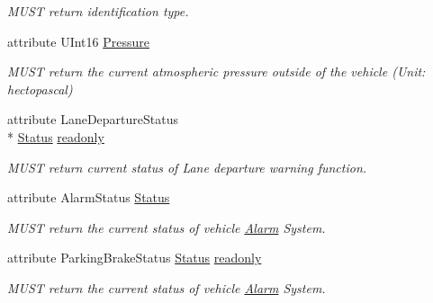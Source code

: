 \begin{DoxyCompactItemize}
\begin{DoxyCompactList}\small\item\em M\+U\+S\+T return identification type. \end{DoxyCompactList}\item 
\hypertarget{interfaceVehiclePropertyType_ab38c3d3e43448122ff441f04e184344b}{attribute U\+Int16 \hyperlink{interfaceVehiclePropertyType_ab38c3d3e43448122ff441f04e184344b}{Pressure}}\label{interfaceVehiclePropertyType_ab38c3d3e43448122ff441f04e184344b}

\begin{DoxyCompactList}\small\item\em M\+U\+S\+T return the current atmospheric pressure outside of the vehicle (Unit\+: hectopascal) \end{DoxyCompactList}\item 
\hypertarget{interfaceVehiclePropertyType_a6366153f0fe90c81378eae321934ce9b}{attribute Lane\+Departure\+Status \\*
\hyperlink{interfaceVehiclePropertyType_adc169ce047115d43399d1ffa9dd1fb83}{Status} \hyperlink{interfaceVehiclePropertyType_a6366153f0fe90c81378eae321934ce9b}{readonly}}\label{interfaceVehiclePropertyType_a6366153f0fe90c81378eae321934ce9b}

\begin{DoxyCompactList}\small\item\em M\+U\+S\+T return current status of Lane departure warning function. \end{DoxyCompactList}\item 
\hypertarget{interfaceVehiclePropertyType_a263f110949917d7a27f64d7a263a3d9c}{attribute Alarm\+Status \hyperlink{interfaceVehiclePropertyType_a263f110949917d7a27f64d7a263a3d9c}{Status}}\label{interfaceVehiclePropertyType_a263f110949917d7a27f64d7a263a3d9c}

\begin{DoxyCompactList}\small\item\em M\+U\+S\+T return the current status of vehicle \hyperlink{interfaceAlarm}{Alarm} System. \end{DoxyCompactList}\item 
\hypertarget{interfaceVehiclePropertyType_af8e356b341ea7e49ba0351547664032c}{attribute Parking\+Brake\+Status \hyperlink{interfaceVehiclePropertyType_adc169ce047115d43399d1ffa9dd1fb83}{Status} \hyperlink{interfaceVehiclePropertyType_af8e356b341ea7e49ba0351547664032c}{readonly}}\label{interfaceVehiclePropertyType_af8e356b341ea7e49ba0351547664032c}

\begin{DoxyCompactList}\small\item\em M\+U\+S\+T return the current status of vehicle \hyperlink{interfaceAlarm}{Alarm} System. \end{DoxyCompactList}\end{DoxyCompactItemize}


